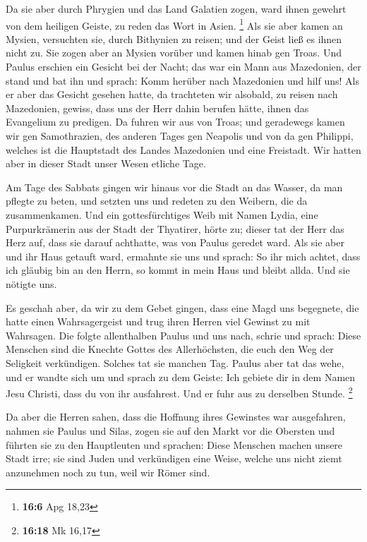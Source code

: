  Da sie aber durch Phrygien und das Land Galatien zogen,
ward ihnen gewehrt von dem heiligen Geiste, zu reden das Wort in Asien.
\footnote{\textbf{16:6} Apg 18,23}  Als sie aber kamen an
Mysien, versuchten sie, durch Bithynien zu reisen; und der Geist ließ es
ihnen nicht zu.  Sie zogen aber an Mysien vorüber und kamen
hinab gen Troas.  Und Paulus erschien ein Gesicht bei der
Nacht; das war ein Mann aus Mazedonien, der stand und bat ihn und
sprach: Komm herüber nach Mazedonien und hilf uns!  Als er
aber das Gesicht gesehen hatte, da trachteten wir alsobald, zu reisen
nach Mazedonien, gewiss, dass uns der Herr dahin berufen hätte, ihnen
das Evangelium zu predigen.  Da fuhren wir aus von Troas;
und geradewegs kamen wir gen Samothrazien, des anderen Tages gen
Neapolis  und von da gen Philippi, welches ist die
Hauptstadt des Landes Mazedonien und eine Freistadt. Wir hatten aber in
dieser Stadt unser Wesen etliche Tage.

 Am Tage des Sabbats gingen wir hinaus vor die Stadt an das
Wasser, da man pflegte zu beten, und setzten uns und redeten zu den
Weibern, die da zusammenkamen.  Und ein gottesfürchtiges
Weib mit Namen Lydia, eine Purpurkrämerin aus der Stadt der Thyatirer,
hörte zu; dieser tat der Herr das Herz auf, dass sie darauf achthatte,
was von Paulus geredet ward.  Als sie aber und ihr Haus
getauft ward, ermahnte sie uns und sprach: So ihr mich achtet, dass ich
gläubig bin an den Herrn, so kommt in mein Haus und bleibt allda. Und
sie nötigte uns.

 Es geschah aber, da wir zu dem Gebet gingen, dass eine
Magd uns begegnete, die hatte einen Wahrsagergeist und trug ihren Herren
viel Gewinst zu mit Wahrsagen.  Die folgte allenthalben
Paulus und uns nach, schrie und sprach: Diese Menschen sind die Knechte
Gottes des Allerhöchsten, die euch den Weg der Seligkeit verkündigen.
 Solches tat sie manchen Tag. Paulus aber tat das wehe, und
er wandte sich um und sprach zu dem Geiste: Ich gebiete dir in dem Namen
Jesu Christi, dass du von ihr ausfahrest. Und er fuhr aus zu derselben
Stunde. \footnote{\textbf{16:18} Mk 16,17}

 Da aber die Herren sahen, dass die Hoffnung ihres
Gewinstes war ausgefahren, nahmen sie Paulus und Silas, zogen sie auf
den Markt vor die Obersten  und führten sie zu den
Hauptleuten und sprachen: Diese Menschen machen unsere Stadt irre; sie
sind Juden  und verkündigen eine Weise, welche uns nicht
ziemt anzunehmen noch zu tun, weil wir Römer sind.

